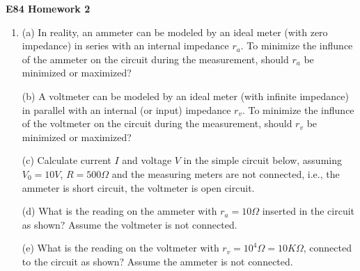 \usepackage{html}

\begin{center}
{\Large \bf E84 Homework 2}
\end{center}
\begin{enumerate}

The calculations of all problems in this assignment set are straight forward.
However, the concepts involving source, load, internal (output) impedance
of the source and the input impedance of the load are very important. After
finding the numerical solutions of the problem, pause and reflect what they
mean. 


\item (a) In reality, an ammeter can be modeled by an ideal meter (with zero impedance)
  in series with an internal impedance $r_a$. To minimize the influnce of the ammeter
  on the circuit during the measurement, should $r_a$ be minimized or maximized?

  (b) A voltmeter can be modeled by an ideal meter (with infinite impedance) in parallel
  with an internal (or input) impedance $r_v$. To minimize the influnce of the voltmeter 
  on the circuit during the measurement, should $r_v$ be minimized or maximized?

  (c) Calculate current $I$ and voltage $V$ in the simple circuit below, assuming 
  $V_0=10V$, $R=500\Omega$ and the measuring meters are not connected, i.e., the ammeter
  is short circuit, the voltmeter is open circuit.

  (d) What is the reading on the ammeter with $r_a=10\Omega$ inserted in the circuit 
  as shown? Assume the voltmeter is not connected.

  (e) What is the reading on the voltmeter with $r_v=10^4 \Omega = 10 K\Omega$, connected
  to the circuit as shown? Assume the ammeter is not connected.








\end{enumerate}
